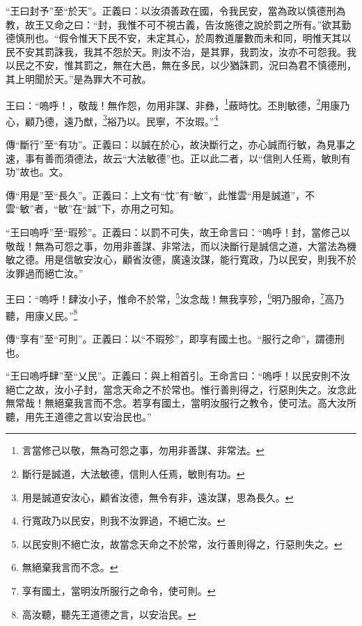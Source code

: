 {\noindent\shu{}\fzkt “王曰封予”至“於天”。正義曰：以汝須善政在國，令我民安，當為政以慎德刑為教，故王又命之曰：“封，我惟不可不視古義，告汝施德之說於罰之所有。”欲其勤德慎刑也。“假令惟天下民不安，未定其心，於周教道屢數而未和同，明惟天其以民不安其罰誅我，我其不怨於天。則汝不治，是其罪，我罰汝，汝亦不可怨我。我以民之不安，惟其罰之，無在大邑，無在多民，以少猶誅罰，況曰為君不慎德刑，其上明聞於天。”是為罪大不可赦。 \par}

王曰：“嗚呼！，敬哉！無作怨，勿用非謀、非彝，\footnote{言當修己以敬，無為可怨之事，勿用非善謀、非常法。}蔽時忱。丕則敏德，\footnote{斷行是誠道，大法敏德，信則人任焉，敏則有功。}用康乃心，顧乃德，遠乃猷，\footnote{用是誠道安汝心，顧省汝德，無令有非，遠汝謀，思為長久。}裕乃以。民寧，不汝瑕。”\footnote{行寬政乃以民安，則我不汝罪過，不絕亡汝。}


{\noindent\zhuan{}\fzbyks 傳“斷行”至“有功”。正義曰：以誠在於心，故決斷行之，亦心誠而行敏，為見事之速，事有善而須德法，故云“大法敏德”也。正以此二者，以“信則人任焉，敏則有功”故也。文。 \par}

{\noindent\zhuan{}\fzbyks 傳“用是”至“長久”。正義曰：上文有“忱”有“敏”，此惟雲“用是誠道”，不雲“敏”者，“敏”在“誠”下，亦用之可知。 \par}

{\noindent\shu{}\fzkt “王曰嗚呼”至“瑕殄”。正義曰：以罰不可失，故王命言曰：“嗚呼！封，當修己以敬哉！無為可怨之事，勿用非善謀、非常法，而以決斷行是誠信之道，大當法為機敏之德。用是信敏安汝心，顧省汝德，廣遠汝謀，能行寬政，乃以民安，則我不於汝罪過而絕亡汝。” \par}

王曰：“嗚呼！肆汝小子，惟命不於常，\footnote{以民安則不絕亡汝，故當念天命之不於常，汝行善則得之，行惡則失之。}汝念哉！無我享殄，\footnote{無絕棄我言而不念。}明乃服命，\footnote{享有國土，當明汝所服行之命令，使可則。}高乃聽，用康乂民。”\footnote{高汝聽，聽先王道德之言，以安治民。}


{\noindent\zhuan{}\fzbyks 傳“享有”至“可則”。正義曰：以“不瑕殄”，即享有國土也。“服行之命”，謂德刑也。 \par}

{\noindent\shu{}\fzkt “王曰嗚呼肆”至“乂民”。正義曰：與上相首引。王命言曰：“嗚呼！以民安則不汝絕亡之故，汝小子封，當念天命之不於常也。惟行善則得之，行惡則失之。汝念此無常哉！無絕棄我言而不念。若享有國土，當明汝服行之教令，使可法。高大汝所聽，用先王道德之言以安治民也。” \par}

